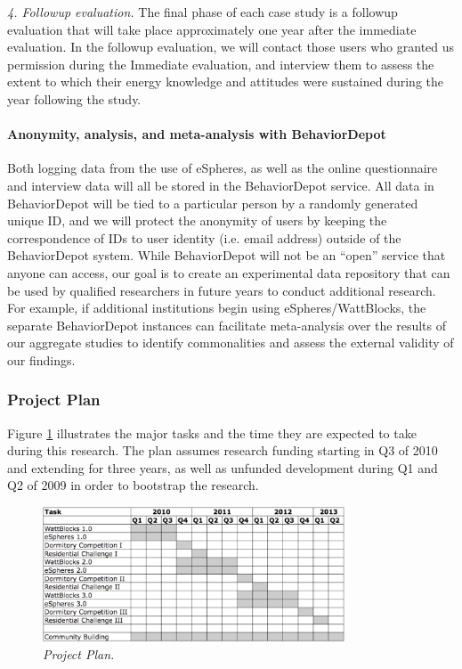 {\em 4. Followup evaluation.}  The final phase of each case study
is a followup evaluation that will take place approximately one year after
the immediate evaluation.   In the followup evaluation, we will contact
those users who granted us permission during the Immediate evaluation, and
interview them to assess the extent to which their energy knowledge and
attitudes were sustained during the year following the study. 

\paragraph{Anonymity, analysis,  and meta-analysis with BehaviorDepot}

Both logging data from the use of eSpheres, as well as the online
questionnaire and interview data will all be stored in the BehaviorDepot
service.  All data in BehaviorDepot will be tied to a particular person by
a randomly generated unique ID, and we will protect the anonymity of users
by keeping the correspondence of IDs to user identity (i.e. email address)
outside of the BehaviorDepot system.  While BehaviorDepot will not be an
``open'' service that anyone can access, our goal is to create an
experimental data repository that can be used by qualified researchers in
future years to conduct additional research.  For example, if additional
institutions begin using eSpheres/WattBlocks, the separate BehaviorDepot
instances can facilitate meta-analysis over the results of our aggregate
studies to identify commonalities and assess the external validity of our
findings.


\subsubsection{Project Plan}
\label{sec:plan}

Figure \ref{fig:plan} illustrates the major tasks and the time they are
expected to take during this research.  The plan assumes research funding
starting in Q3 of 2010 and extending for three years, as well as unfunded
development during Q1 and Q2 of 2009 in order to bootstrap the
research.

\begin{figure}[th]
  \center
  \includegraphics[width=0.8\textwidth]{gantt.eps}
  \caption{\em \small Project Plan.}
 \label{fig:plan}
\end{figure} 

